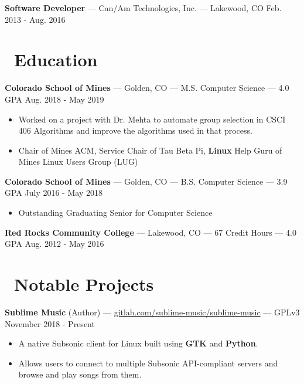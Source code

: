 \documentclass[10pt,letterpaper]{article}
\begin{document}
\vspace{2pt}
\textbf{Software Developer} --- Can/Am Technologies, Inc. --- Lakewood, CO
\hfill Feb. 2013 - Aug. 2016

\section*{\faBook\ Education}
\textbf{Colorado School of Mines} --- Golden, CO --- M.S. Computer Science --- 4.0 GPA
\hfill Aug. 2018 - May 2019
\begin{itemize}
    \item Worked on a project with Dr. Mehta to automate group selection in
        CSCI 406 Algorithms and improve the algorithms used in that process.
    \item Chair of Mines ACM, Service Chair of Tau Beta Pi, \textbf{Linux} Help
        Guru of Mines Linux Users Group (LUG)
\end{itemize}

\textbf{Colorado School of Mines} --- Golden, CO --- B.S. Computer Science --- 3.9 GPA
\hfill July 2016 - May 2018
\begin{itemize}
    \item Outstanding Graduating Senior for Computer Science
\end{itemize}

\textbf{Red Rocks Community College} --- Lakewood, CO --- 67 Credit Hours --- 4.0 GPA
\hfill Aug. 2012 - May 2016

\section*{\faCode\ Notable Projects}
\textbf{Sublime Music} (Author) ---
\href{https://gitlab.com/sublime-music/sublime-music}{gitlab.com/sublime-music/sublime-music}
--- GPLv3 \hfill November 2018 - Present
\begin{itemize}
    \item A native Subsonic client for Linux built using \textbf{GTK} and
        \textbf{Python}.
    \item Allows users to connect to multiple Subsonic API-compliant servers and
        browse and play songs from them.
\end{itemize}
\end{document}
